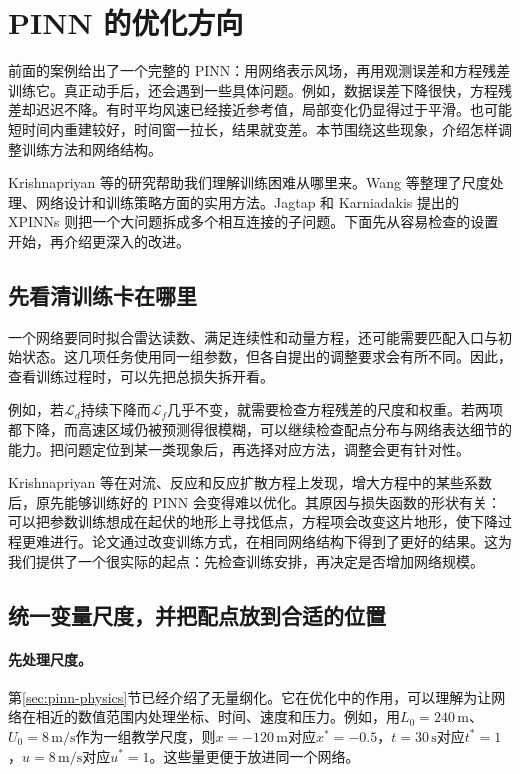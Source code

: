 \FloatBarrier
\section{PINN 的优化方向}
\label{sec:pinn-optimization}
前面的案例给出了一个完整的 PINN：用网络表示风场，再用观测误差和方程残差训练它。真正动手后，还会遇到一些具体问题。例如，数据误差下降很快，方程残差却迟迟不降。有时平均风速已经接近参考值，局部变化仍显得过于平滑。也可能短时间内重建较好，时间窗一拉长，结果就变差。本节围绕这些现象，介绍怎样调整训练方法和网络结构。

Krishnapriyan 等的研究帮助我们理解训练困难从哪里来\cite{krishnapriyan2021failure}。Wang 等整理了尺度处理、网络设计和训练策略方面的实用方法\cite{wang2023expert}。Jagtap 和 Karniadakis 提出的 XPINNs 则把一个大问题拆成多个相互连接的子问题\cite{jagtap2020xpinn}。下面先从容易检查的设置开始，再介绍更深入的改进。

\subsection{先看清训练卡在哪里}
一个网络要同时拟合雷达读数、满足连续性和动量方程，还可能需要匹配入口与初始状态。这几项任务使用同一组参数，但各自提出的调整要求会有所不同。因此，查看训练过程时，可以先把总损失拆开看。

例如，若$\mathcal L_d$持续下降而$\mathcal L_f$几乎不变，就需要检查方程残差的尺度和权重。若两项都下降，而高速区域仍被预测得很模糊，可以继续检查配点分布与网络表达细节的能力。把问题定位到某一类现象后，再选择对应方法，调整会更有针对性。

Krishnapriyan 等在对流、反应和反应扩散方程上发现，增大方程中的某些系数后，原先能够训练好的 PINN 会变得难以优化。其原因与损失函数的形状有关：可以把参数训练想成在起伏的地形上寻找低点，方程项会改变这片地形，使下降过程更难进行。论文通过改变训练方式，在相同网络结构下得到了更好的结果\cite{krishnapriyan2021failure}。这为我们提供了一个很实际的起点：先检查训练安排，再决定是否增加网络规模。

\subsection{统一变量尺度，并把配点放到合适的位置}
\paragraph{先处理尺度。}
第\ref{sec:pinn-physics}节已经介绍了无量纲化。它在优化中的作用，可以理解为让网络在相近的数值范围内处理坐标、时间、速度和压力。例如，用$L_0=240\,\mathrm{m}$、$U_0=8\,\mathrm{m/s}$作为一组教学尺度，则$x=-120\,\mathrm{m}$对应$x^*=-0.5$，$t=30\,\mathrm{s}$对应$t^*=1$，$u=8\,\mathrm{m/s}$对应$u^*=1$。这些量更便于放进同一个网络。


